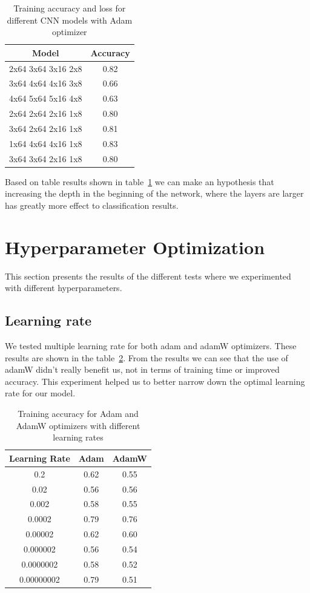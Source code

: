 \documentclass[12pt,a4paper,english
]{tunithesis}
\begin{document}
\begin{table}[h!]
\centering
\caption{Training accuracy and loss for different CNN models with Adam optimizer}
\begin{tabular}{|c|c|}
\hline
\textbf{Model} & \textbf{Accuracy}  \\ \hline
2x64 3x64 3x16 2x8 & 0.82 \\ \hline
3x64 4x64 4x16 3x8 & 0.66 \\ \hline
4x64 5x64 5x16 4x8 & 0.63 \\ \hline
2x64 2x64 2x16 1x8 & 0.80 \\ \hline
3x64 2x64 2x16 1x8 & 0.81 \\ \hline
1x64 4x64 4x16 1x8 & 0.83 \\ \hline
3x64 3x64 2x16 1x8 & 0.80 \\ \hline
\end{tabular}
\label{tab:models}
\end{table}

Based on table results shown in table~\ref{tab:models} we can make an hypothesis that increasing the depth in the beginning of the network, where the layers are larger has greatly more effect to classification results.

\section{Hyperparameter Optimization}
This section presents the results of the different tests where we experimented with different hyperparameters.

\subsection{Learning rate}
We tested multiple learning rate for both adam and adamW optimizers. These results are shown in the table~\ref{tab:learningrates}. From the results we can see that the use of adamW didn't really benefit us, not in terms of training time or improved accuracy. This experiment helped us to better narrow down the optimal learning rate for our model.
\begin{table}[h!]
\centering
\caption{Training accuracy for Adam and AdamW optimizers with different learning rates}
\begin{tabular}{|c|c|c|}
\hline
\textbf{Learning Rate} & \textbf{Adam} & \textbf{AdamW} \\ \hline
0.2 & 0.62 & 0.55 \\ \hline
0.02 & 0.56 & 0.56 \\ \hline
0.002 & 0.58 & 0.55 \\ \hline
0.0002 & 0.79 & 0.76 \\ \hline
0.00002 & 0.62 & 0.60 \\ \hline
0.000002 & 0.56 & 0.54 \\ \hline
0.0000002 & 0.58 & 0.52 \\ \hline
0.00000002 & 0.79 & 0.51 \\ \hline
\end{tabular}
\label{tab:learningrates}
\end{table}
\end{document}
